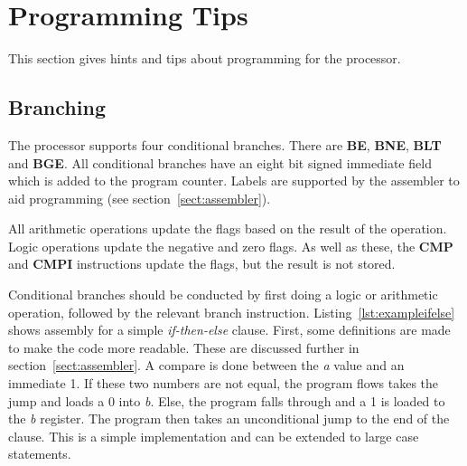 
\section{Programming Tips}
{}



This section gives hints and tips about programming for the \samurai{} processor. 

\subsection{Branching}

The \samurai{} processor supports four conditional branches. %
There are \textbf{BE}, \textbf{BNE}, \textbf{BLT} and \textbf{BGE}.
All conditional branches have an eight bit signed immediate field which is added to the program counter.
Labels are supported by the assembler to aid programming (see section~\ref{sect:assembler}).

All arithmetic operations update the flags based on the result of the operation. 
Logic operations update the negative and zero flags. 
As well as these, the \textbf{CMP} and \textbf{CMPI} instructions update the flags, but the result is not stored. 

Conditional branches should be conducted by first doing a logic or arithmetic operation, followed by the relevant branch instruction. 
Listing~\ref{lst:exampleifelse} shows assembly for a simple \textit{if-then-else} clause. 
First, some definitions are made to make the code more readable. 
These are discussed further in section~\ref{sect:assembler}.
A compare is done between the \textit{a} value and an immediate 1. 
If these two numbers are not equal, the program flows takes the jump and loads a 0 into \textit{b}.
Else, the program falls through and a 1 is loaded to the \textit{b} register. 
The program then takes an unconditional jump to the end of the clause. 
This is a simple implementation and can be extended to large case statements.

